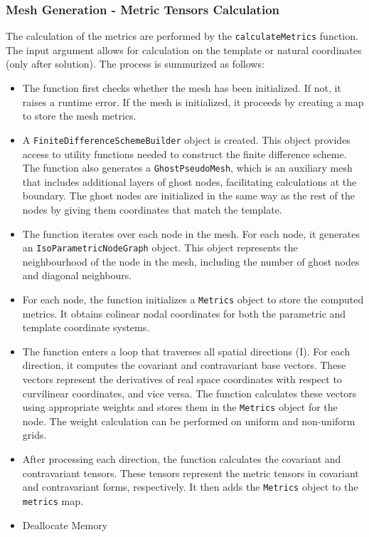 \documentclass{article}
\begin{document}
	
	\subsubsection{Mesh Generation - Metric Tensors Calculation}
	The calculation of the metrics are performed by the \texttt{calculateMetrics} function. The input argument allows for calculation on the template or natural coordinates (only after solution). The process is summurized as follows:
	\begin{itemize}
		\item The function first checks whether the mesh has been initialized. If not, it raises a runtime error. If the mesh is initialized, it proceeds by creating a map to store the mesh metrics.
		
		\item A \texttt{FiniteDifferenceSchemeBuilder} object is created. This object provides access to utility functions needed to construct the finite difference scheme. The function also generates a \texttt{GhostPseudoMesh}, which is an auxiliary mesh that includes additional layers of ghost nodes, facilitating calculations at the boundary. The ghost nodes are initialized in the same way as the rest of the nodes by giving them coordinates that match the template.
		
		\item The function iterates over each node in the mesh. For each node, it generates an \newline \texttt{IsoParametricNodeGraph} object. This object represents the neighbourhood of the node in the mesh, including the number of ghost nodes and diagonal neighbours. 
		
		\item For each node, the function initializes a \texttt{Metrics} object to store the computed metrics. It obtains colinear nodal coordinates for both the parametric and template coordinate systems.
		
		\item The function enters a loop that traverses all spatial directions (I). For each direction, it computes the covariant and contravariant base vectors. These vectors represent the derivatives of real space coordinates with respect to curvilinear coordinates, and vice versa. The function calculates these vectors using appropriate weights and stores them in the \texttt{Metrics} object for the node. The weight calculation can be performed on uniform and non-uniform grids.
		
		\item After processing each direction, the function calculates the covariant and contravariant tensors. These tensors represent the metric tensors in covariant and contravariant forms, respectively. It then adds the \texttt{Metrics} object to the \texttt{metrics} map.
		
		\item Deallocate Memory
	\end{itemize}
\end{document}
